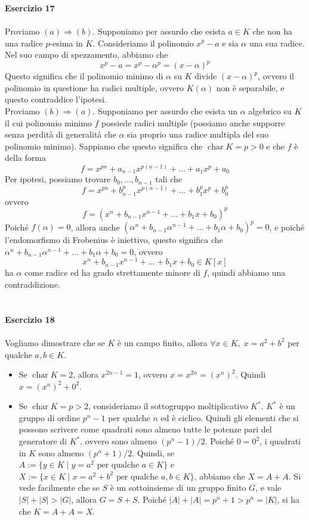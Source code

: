\documentclass[12pt,a4paper]{report}
\theoremstyle{definition}
\DeclareMathOperator{\car}{char}
\begin{document}
\\
\\
\\
\noindent\textbf{Esercizio 17}\\
\\
Proviamo $(a) \Longrightarrow (b)$. Supponiamo per assurdo che esista $a \in K$ che non ha una radice $p$-esima in $K$. Consideriamo il polinomio $x^p-a$ e sia $\alpha$ una sua radice. Nel suo campo di spezzamento, abbiamo che
$$x^p-a=x^p-\alpha^p=(x-\alpha)^p$$
Questo significa che il polinomio minimo di $\alpha$ su $K$ divide $(x-\alpha)^p$, ovvero il polinomio in questione ha radici multiple, ovvero $K(\alpha)$ non è separabile, e questo contraddice l'ipotesi.\\
Proviamo  $(b) \Longrightarrow (a)$. Supponiamo per assurdo che esista un $\alpha$ algebrico su $K$ il cui polinomio minimo $f$ possiede radici multiple (possiamo anche supporre senza perdità di generalità che $\alpha$ sia proprio una radice multipla del suo polinomio minimo). Sappiamo che questo significa che $\car K=p>0$ e che $f$ è della forma
$$f = x^{pn} + a_{n-1}x^{p(n-1)} + \dots + a_1 x^p + a_0$$ 
Per ipotesi, possiamo trovare $b_0,...,b_{n-1}$ tali che 
$$f = x^{pn} + b_{n-1}^px^{p(n-1)} + \dots + b_1^p x^p + b_0^p$$ 
ovvero
$$f = (x^{n} + b_{n-1}x^{n-1} + \dots + b_1 x + b_0)^p$$ 
Poiché $f(\alpha)=0$, allora anche $(\alpha^{n} + b_{n-1} \alpha^{n-1} + \dots + b_1 \alpha + b_0)^p=0$, e poiché l'endomorfismo di Frobenius è iniettivo, questo significa che $\alpha^{n} + b_{n-1} \alpha^{n-1} + \dots + b_1 \alpha + b_0=0$, ovvero
$$x^{n} + b_{n-1}x^{n-1} + \dots + b_1 x + b_0 \in K[x]$$
ha $\alpha$ come radice ed ha grado strettamente minore di $f$, quindi abbiamo una contraddizione.
\\
\\
\\
\noindent\textbf{Esercizio 18}\\
\\
Vogliamo dimostrare che se $K$ è un campo finito, allora $\forall x \in K, \; x=a^2+b^2$ per qualche $a,b \in K$.
\begin{itemize}
\item Se $\car K=2$, allora $x^{2n-1}=1$, ovvero $x=x^{2n}=(x^n)^2$. Quindi $x=(x^n)^2+0^2$.
\item Se $\car K=p>2$, consideriamo il sottogruppo moltiplicativo $K^*$. $K^*$ è un gruppo di ordine $p^n-1$ per qualche $n$ ed è ciclico. Quindi gli elementi che si possono scrivere come quadrati sono almeno tutte le potenze pari del generatore di $K^*$, ovvero sono almeno $(p^n-1)/2$. Poiché $0=0^2$, i quadrati in $K$ sono almeno $(p^n+1)/2$. Quindi, se $A:=\{y \in K \; | \; y=a^2 \text{ per qualche } a \in K \}$ e $X:=\{x \in K \; | \; x=a^2+b^2 \text{ per qualche } a,b \in K \}$, abbiamo che $X=A+A$. Si vede facilmente che se $S$ è un sottoinsieme di un gruppo finito $G$, e vale $|S|+|S|>|G|$, allora $G=S+S$. Poiché $|A|+|A|=p^n+1>p^n=|K|$, si ha che $K=A+A=X$.
\end{itemize}
\end{document}

